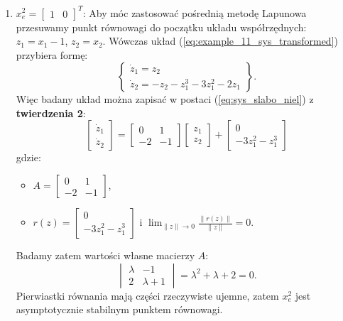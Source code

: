 \documentclass{article}
\begin{document}
\begin{enumerate}
            \item $x_{e}^{2} = \begin{bmatrix} 1 & 0 \end{bmatrix}^{T}$:
            Aby móc zastosować pośrednią metodę Lapunowa przesuwamy punkt równowagi do początku układu współrzędnych: $z_{1} = x_{1} - 1$, $z_{2} = x_{2}$. Wówczas układ (\ref{eq:example_11_sys_transformed}) przybiera formę:
            $$
                \left\{
                \begin{array}{l}
                     \dot{z}_{1} = z_{2}\\
                     \dot{z}_{2} = -z_{2} - z_{1}^{3} - 3z_{1}^{2} - 2z_{1}
                \end{array}
                \right\}.
            $$
            Więc badany układ można zapisać w postaci (\ref{eq:sys_slabo_niel}) z \textbf{twierdzenia 2}:
            $$
                \begin{bmatrix} \dot{z}_{1} \\ \dot{z}_{2} \end{bmatrix}
                =
                \begin{bmatrix} 0 & 1 \\ -2 & -1 \end{bmatrix}
                \begin{bmatrix} z_{1} \\ z_{2} \end{bmatrix}
                +
                \begin{bmatrix} 0 \\ -3z_{1}^{2} - z_{1}^{3} \end{bmatrix}
            $$
            gdzie:
            \begin{itemize}
                \item $A = \begin{bmatrix} 0 & 1 \\ -2 & -1 \end{bmatrix}$,
                \item $r(z) = \begin{bmatrix} 0 \\ -3z_{1}^{2} - z_{1}^{3} \end{bmatrix}$ i $\lim_{\lVert z \rVert \rightarrow 0}\frac{\lVert r(z) \rVert}{\lVert z \rVert} = 0$.
            \end{itemize}
            Badamy zatem wartości własne macierzy $A$:
            $$
                \begin{vmatrix} \lambda & -1\\ 2 & \lambda + 1 \end{vmatrix} = \lambda^{2} + \lambda + 2 = 0.
            $$
            Pierwiastki równania mają części rzeczywiste ujemne, zatem $x_{e}^{2}$ jest asymptotycznie stabilnym punktem równowagi.
            

\end{enumerate}
\end{document}
